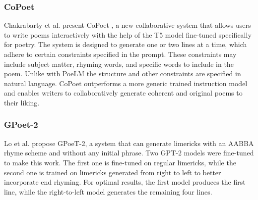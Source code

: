 \subsubsection{CoPoet}
Chakrabarty et al. present CoPoet \cite{chakrabarty-etal-2022-help}, a new collaborative system that allows users to write poems interactively with the help of the T5 model fine-tuned specifically for poetry. The system is designed to generate one or two lines at a time, which adhere to certain constraints specified in the prompt. These constraints may include subject matter, rhyming words, and specific words to include in the poem. Unlike with PoeLM the structure and other constraints are specified in natural language. CoPoet outperforms a more generic trained instruction model and enables writers to collaboratively generate coherent and original poems to their liking.

\subsubsection{GPoet-2}
Lo et al. propose GPoeT-2\cite{lo2022gpoet2}, a system that can generate limericks with an AABBA rhyme scheme and without any initial phrase.  Two GPT-2 models were fine-tuned to make this work. The first one is fine-tuned on regular limericks, while the second one is trained on limericks generated from right to left to better incorporate end rhyming. For optimal results, the first model produces the first line, while the right-to-left model generates the remaining four lines.


